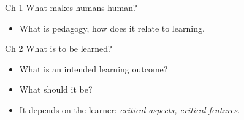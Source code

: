 \begin{frame}
  \begin{block}{Ch 1 What makes humans human?}
    \begin{itemize}
      \item What is pedagogy, how does it relate to learning.
    \end{itemize}
  \end{block}
\end{frame}

\begin{frame}
  \begin{block}{Ch 2 What is to be learned?}
    \begin{itemize}
      \item What is an intended learning outcome?
      \item What should it be?
      \item It depends on the learner: \emph{critical aspects, critical 
        features}.
    \end{itemize}
  \end{block}
\end{frame}

